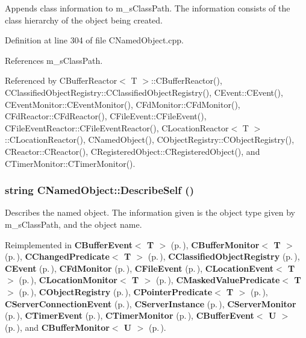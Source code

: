 Appends class information to m\_\-s\-Class\-Path. The information consists of the class hierarchy of the object being created. 

Definition at line 304 of file CNamed\-Object.cpp.

References m\_\-s\-Class\-Path.

Referenced by CBuffer\-Reactor$<$ T $>$::CBuffer\-Reactor(), CClassified\-Object\-Registry::CClassified\-Object\-Registry(), CEvent::CEvent(), CEvent\-Monitor::CEvent\-Monitor(), CFd\-Monitor::CFd\-Monitor(), CFd\-Reactor::CFd\-Reactor(), CFile\-Event::CFile\-Event(), CFile\-Event\-Reactor::CFile\-Event\-Reactor(), CLocation\-Reactor$<$ T $>$::CLocation\-Reactor(), CNamed\-Object(), CObject\-Registry::CObject\-Registry(), CReactor::CReactor(), CRegistered\-Object::CRegistered\-Object(), and CTimer\-Monitor::CTimer\-Monitor().
\subsubsection{\setlength{\rightskip}{0pt plus 5cm}string CNamed\-Object::Describe\-Self ()\hspace{0.3cm}{\tt  [virtual]}}\label{classCNamedObject_a8}


Describes the named object. The information given is the object type given by m\_\-s\-Class\-Path, and the object name. 

Reimplemented in {\bf CBuffer\-Event$<$ T $>$} {\rm (p.\,\pageref{classCBufferEvent_a14})}, {\bf CBuffer\-Monitor$<$ T $>$} {\rm (p.\,\pageref{classCBufferMonitor_a17})}, {\bf CChanged\-Predicate$<$ T $>$} {\rm (p.\,\pageref{classCChangedPredicate_a7})}, {\bf CClassified\-Object\-Registry} {\rm (p.\,\pageref{classCClassifiedObjectRegistry_a11})}, {\bf CEvent} {\rm (p.\,\pageref{classCEvent_a16})}, {\bf CFd\-Monitor} {\rm (p.\,\pageref{classCFdMonitor_a12})}, {\bf CFile\-Event} {\rm (p.\,\pageref{classCFileEvent_a19})}, {\bf CLocation\-Event$<$ T $>$} {\rm (p.\,\pageref{classCLocationEvent_a10})}, {\bf CLocation\-Monitor$<$ T $>$} {\rm (p.\,\pageref{classCLocationMonitor_a11})}, {\bf CMasked\-Value\-Predicate$<$ T $>$} {\rm (p.\,\pageref{classCMaskedValuePredicate_a8})}, {\bf CObject\-Registry} {\rm (p.\,\pageref{classCObjectRegistry_a9})}, {\bf CPointer\-Predicate$<$ T $>$} {\rm (p.\,\pageref{classCPointerPredicate_a6})}, {\bf CServer\-Connection\-Event} {\rm (p.\,\pageref{classCServerConnectionEvent_a14})}, {\bf CServer\-Instance} {\rm (p.\,\pageref{classCServerInstance_a11})}, {\bf CServer\-Monitor} {\rm (p.\,\pageref{classCServerMonitor_a8})}, {\bf CTimer\-Event} {\rm (p.\,\pageref{classCTimerEvent_a12})}, {\bf CTimer\-Monitor} {\rm (p.\,\pageref{classCTimerMonitor_a10})}, {\bf CBuffer\-Event$<$ U $>$} {\rm (p.\,\pageref{classCBufferEvent_a14})}, and {\bf CBuffer\-Monitor$<$ U $>$} {\rm (p.\,\pageref{classCBufferMonitor_a17})}.

